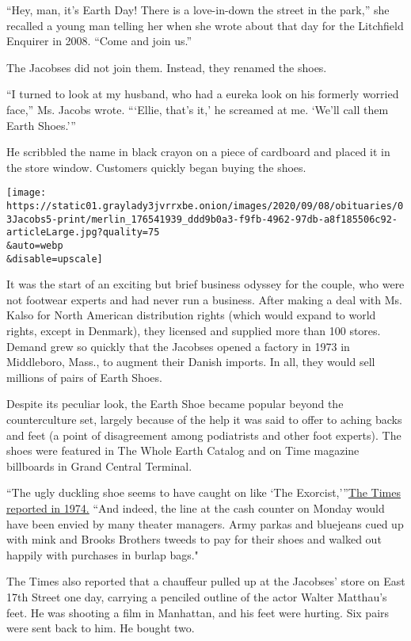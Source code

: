 ``Hey, man, it's Earth Day! There is a love-in-down the street in the
park,'' she recalled a young man telling her when she wrote about that
day for the Litchfield Enquirer in 2008. ``Come and join us.''

The Jacobses did not join them. Instead, they renamed the shoes.

``I turned to look at my husband, who had a eureka look on his formerly
worried face,'' Ms. Jacobs wrote. ```Ellie, that's it,' he screamed at
me. `We'll call them Earth Shoes.'''

He scribbled the name in black crayon on a piece of cardboard and placed
it in the store window. Customers quickly began buying the shoes.

\texttt{[image: https://static01.graylady3jvrrxbe.onion/images/2020/09/08/obituaries/03Jacobs5-print/merlin\_176541939\_ddd9b0a3-f9fb-4962-97db-a8f185506c92-articleLarge.jpg?quality=75\\\&auto=webp\\\&disable=upscale]}

It was the start of an exciting but brief business odyssey for the
couple, who were not footwear experts and had never run a business.
After making a deal with Ms. Kalso for North American distribution
rights (which would expand to world rights, except in Denmark), they
licensed and supplied more than 100 stores. Demand grew so quickly that
the Jacobses opened a factory in 1973 in Middleboro, Mass., to augment
their Danish imports. In all, they would sell millions of pairs of Earth
Shoes.

Despite its peculiar look, the Earth Shoe became popular beyond the
counterculture set, largely because of the help it was said to offer to
aching backs and feet (a point of disagreement among podiatrists and
other foot experts). The shoes were featured in The Whole Earth Catalog
and on Time magazine billboards in Grand Central Terminal.

``The ugly duckling shoe seems to have caught on like `The
Exorcist,'''\href{https://www.nytimes3xbfgragh.onion/1974/02/25/archives/shoes-that-make-you-waddle-like-a-duckand-they-sell.html}{The
Times reported in 1974.} ``And indeed, the line at the cash counter on
Monday would have been envied by many theater managers. Army parkas and
bluejeans cued up with mink and Brooks Brothers tweeds to pay for their
shoes and walked out happily with purchases in burlap bags."

The Times also reported that a chauffeur pulled up at the Jacobses'
store on East 17th Street one day, carrying a penciled outline of the
actor Walter Matthau's feet. He was shooting a film in Manhattan, and
his feet were hurting. Six pairs were sent back to him. He bought two.

